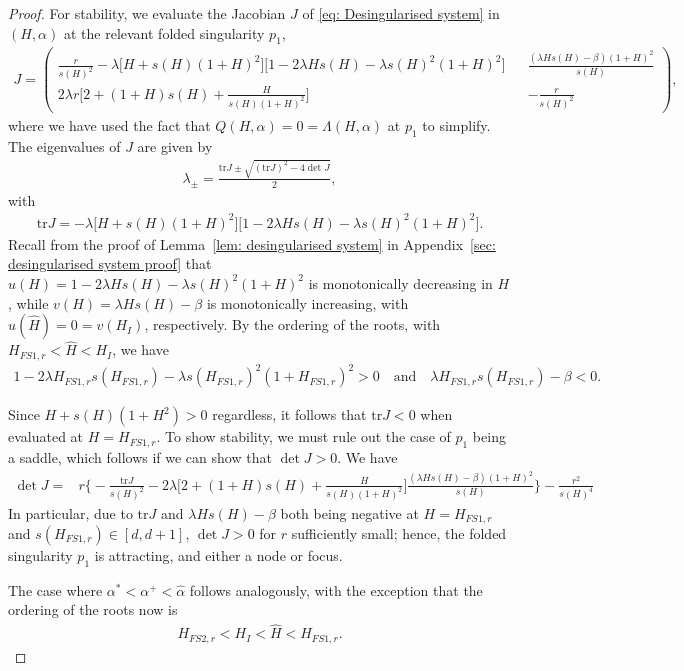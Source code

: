 \documentclass{article}
\theoremstyle{definition}
\numberwithin{equation}{section}
\begin{document}
\begin{proof}
For stability, we evaluate the Jacobian $J$ of \eqref{eq: Desingularised system} in $(H,\alpha)$ at the relevant folded singularity $p_1$,
\begin{align*}
    J = \begin{pmatrix}
        \frac{r}{s(H)^2}-\lambda \big[H+s(H)(1+H)^2\big]\big[1-2\lambda Hs(H)-\lambda s(H)^2(1+H)^2\big] && \frac{(\lambda H s(H)-\beta)(1+H)^2}{s(H)} \\
        2\lambda r\Big[2+(1+H)s(H)+\frac{H}{s(H)(1+H)^2}\Big] && -\frac{r}{s(H)^2}
        \label{Jacobian desingularised}
    \end{pmatrix},
\end{align*}
where we have used the fact that $Q(H,\alpha)=0=\Lambda(H,\alpha)$ at $p_1$ to simplify. The eigenvalues of $J$ are given by
\begin{align}
    \lambda_{\pm} = \frac{\mathrm{tr}J\pm\sqrt{(\mathrm{tr}J)^2-4\det{J}}}{2},
\end{align}
with
\begin{align*}
    \mathrm{tr}J = -\lambda \big[H+s(H)(1+H)^2\big]\big[1-2\lambda Hs(H)-\lambda s(H)^2(1+H)^2\big].
\end{align*}
Recall from the proof of Lemma~\ref{lem: desingularised system} in Appendix~\ref{sec: desingularised system proof} that $u(H)=1-2\lambda H s(H)-\lambda s(H)^2(1+H)^2$ is monotonically decreasing in $H$, while $v(H)=\lambda H s(H)-\beta$ is monotonically increasing, with $u(\hat{H})=0=v(H_I)$, respectively. By the ordering of the roots, with $H_{FS1,r}<\hat{H}<H_I$, we have
\begin{align*}
1-2\lambda H_{FS1,r}s(H_{FS1,r})-\lambda s(H_{FS1,r})^2(1+H_{FS1,r})^2>0\quad\text{and}\quad
\lambda H_{FS1,r}s(H_{FS1,r})-\beta<0.
\end{align*}

Since $H+s(H)(1+H^2)>0$ regardless, it follows that $\mathrm{tr}J<0$ when evaluated at $H=H_{FS1,r}$. To show stability, we must rule out the case of $p_1$ being a saddle, which follows if we can show that $\det{J}>0$. We have
\begin{align*}
    \det{J} =& r\bigg\{-\frac{\mathrm{tr}J}{s(H)^2}-2\lambda\bigg[2+(1+H)s(H)+\frac{H}{s(H)(1+H)^2}\bigg]\frac{(\lambda H s(H)-\beta)(1+H)^2}{s(H)}\bigg\}-\frac{r^2}{s(H)^4} 
\end{align*}
In particular, due to $\mathrm{tr}J$ and $\lambda Hs(H)-\beta$ both being negative at $H=H_{FS1,r}$ and $s(H_{FS1,r})\in[d,d+1]$, $\det J>0$ for $r$ sufficiently small; hence, the folded singularity $p_1$ is attracting, and either a node or focus. 

The case where $\alpha^\ast<\alpha^{+}<\hat\alpha$ follows analogously, with the exception that the ordering of the roots now is 
\begin{align*}
     H_{FS2,r}<H_I<\hat{H}<H_{FS1,r}.
\end{align*}
\end{proof}
\end{document}
